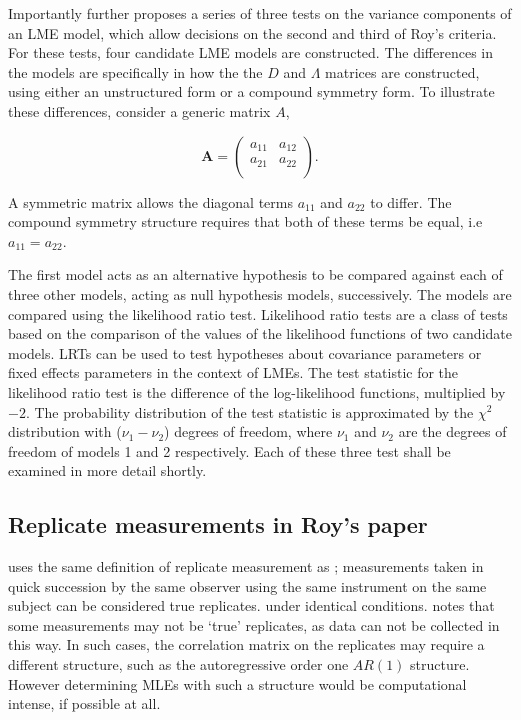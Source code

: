 \documentclass[12pt, a4paper]{report}
\theoremstyle{plain}
\theoremstyle{definition}
\theoremstyle{remark}
\begin{document}
			Importantly \citet{ARoy2009} further proposes a series of three tests on the variance components of an LME model, which allow decisions on the second and third of Roy's criteria. For these tests, four candidate LME models are constructed. The differences in the models are specifically in how the the $D$ and $\Lambda$ matrices are constructed, using either an unstructured form or a compound symmetry form. To illustrate these differences, consider a generic matrix $A$,
			
			\[
			\boldsymbol{A} = \left( \begin{array}{cc}
			a_{11} & a_{12}  \\
			a_{21} & a_{22}  \\
			\end{array}\right).
			\]
			
			A symmetric matrix allows the diagonal terms $a_{11}$ and $a_{22}$ to differ. The compound symmetry structure requires that both of these terms be equal, i.e $a_{11} = a_{22}$.
			
			The first model acts as an alternative hypothesis to be compared against each of three other models, acting as null hypothesis models, successively. The models are compared using the likelihood ratio test. Likelihood ratio tests are a class of tests based on the comparison of the values of the likelihood functions of two candidate models. LRTs can be used to test hypotheses about covariance parameters or fixed effects parameters in the context of LMEs. The test statistic for the likelihood ratio test is the difference of the log-likelihood functions, multiplied by $-2$.
			The probability distribution of the test statistic is approximated by the $\chi^2$ distribution with ($\nu_{1} - \nu_{2}$) degrees of freedom, where $\nu_{1}$ and $\nu_{2}$ are the degrees of freedom of models 1 and 2 respectively. Each of these three test shall be examined in more detail shortly.
			
			
			\subsection{Replicate measurements in Roy's paper}
			
			
			\citet{ARoy2009} uses the same definition of replicate measurement as \citet{BA99}; 	measurements taken in quick succession by the same observer using the same instrument on the same subject can be considered true replicates.
			under identical conditions. \citet{ARoy2009} notes that some measurements may not be `true' replicates, as data can not be collected in this way. In such cases, the correlation matrix on the replicates may require a different structure, such as the autoregressive order one $AR(1)$ structure. However determining MLEs with such a structure would be computational intense, if possible at all.
			
\end{document}
